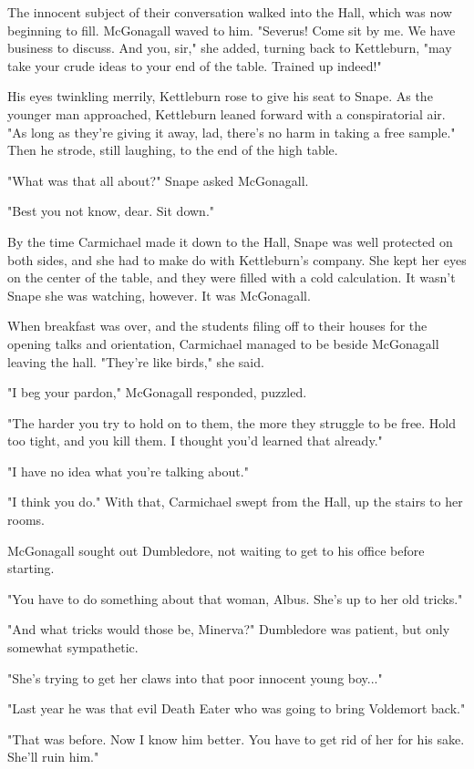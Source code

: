 \documentclass[a4paper,11pt]{article}
\begin{document}
The innocent subject of their conversation walked into the Hall, which was now beginning to fill. McGonagall waved to him. "Severus! Come sit by me. We have business to discuss. And you, sir," she added, turning back to Kettleburn, "may take your crude ideas to your end of the table. Trained up indeed!"

His eyes twinkling merrily, Kettleburn rose to give his seat to Snape. As the younger man approached, Kettleburn leaned forward with a conspiratorial air. "As long as they're giving it away, lad, there's no harm in taking a free sample." Then he strode, still laughing, to the end of the high table.

"What was that all about?" Snape asked McGonagall.

"Best you not know, dear. Sit down."

By the time Carmichael made it down to the Hall, Snape was well protected on both sides, and she had to make do with Kettleburn's company. She kept her eyes on the center of the table, and they were filled with a cold calculation. It wasn't Snape she was watching, however. It was McGonagall.

When breakfast was over, and the students filing off to their houses for the opening talks and orientation, Carmichael managed to be beside McGonagall leaving the hall. "They're like birds," she said.

"I beg your pardon," McGonagall responded, puzzled.

"The harder you try to hold on to them, the more they struggle to be free. Hold too tight, and you kill them. I thought you'd learned that already."

"I have no idea what you're talking about."

"I think you do." With that, Carmichael swept from the Hall, up the stairs to her rooms.

McGonagall sought out Dumbledore, not waiting to get to his office before starting.

"You have to do something about that woman, Albus. She's up to her old tricks."

"And what tricks would those be, Minerva?" Dumbledore was patient, but only somewhat sympathetic.

"She's trying to get her claws into that poor innocent young boy..."

"Last year he was that evil Death Eater who was going to bring Voldemort back."

"That was before. Now I know him better. You have to get rid of her for his sake. She'll ruin him."
\end{document}
